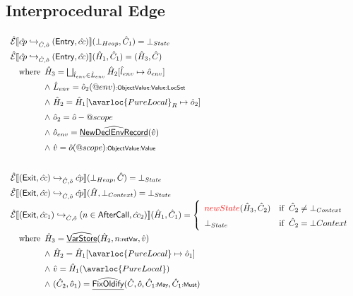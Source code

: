 \subsection{Interprocedural Edge}
\[
\renewcommand\arraystretch{1.5}
\begin{array}{l}
\aE \lbr \acp \cfgnext_{\hat{C},\hat{o}} (\SF{Entry},\hat{cc}) \rbr (\bot_{Heap},\hat{C}_1) 
    = \bot_{State}\\

\aE \lbr \acp \cfgnext_{\hat{C},\hat{o}} (\SF{Entry},\hat{cc}) \rbr (\hat{H}_1,\hat{C}_1) 
    = (\hat{H}_3,\hat{C}) \\
  \quad\wherec{
    \hat{H}_3 = \bigsqcup_{\hat{l}_{env}\in \hat{L}_{env}} \hat{H}_2[\hat{l}_{env} \mapsto \hat{o}_{env}]\\
    \land\ \hat{L}_{env} = \hat{o}_2(\varprop{env})\tsf{:ObjectValue:Value:LocSet}\\
    \land\ \hat{H}_2 = \hat{H}_1[\avarloc{PureLocal}_R \mapsto \hat{o}_2] \\
    \land\ \hat{o}_2 = \hat{o} - \varprop{scope} \\
    \land\ \hat{o}_{env} = \ahf{NewDeclEnvRecord}(\hat{v}) \\
    \land\ \hat{v} = \hat{o}(\varprop{scope})\tsf{:ObjectValue:Value}
  }
\\\\

\aE \lbr (\SF{Exit}, \hat{cc}) \cfgnext_{\hat{C},\hat{o}} \acp \rbr (\bot_{Heap}, \hat{C})
    = \bot_{State}\\

\aE \lbr (\SF{Exit}, \hat{cc}) \cfgnext_{\hat{C},\hat{o}} \acp \rbr (\hat{H}, \bot_{Context})
    = \bot_{State}\\

\aE \lbr (\SF{Exit}, \hat{cc}_1) \cfgnext_{\hat{C},\hat{o}} (n \in \SF{AfterCall}, \hat{cc}_2) \rbr (\hat{H}_1, \hat{C}_1)
   = \left\{
   \begin{array}{ll}
   {\inred new State}(\hat{H}_3, \hat{C}_2) & \ifc{\hat{C}_2 \neq \bot_{Context}}\\
   \bot_{State} & \ifc{\hat{C}_2 = \bot{Context}}\\
   \end{array}
   \right. \\
\quad\wherec{
    \hat{H}_3 = \ahf{VarStore}(\hat{H}_2, n\tsf{:retVar}, \hat{v})\\
	\land\ \hat{H}_2 = \hat{H}_1[\avarloc{PureLocal} \mapsto \hat{o}_1]\\
	\land\ \hat{v} = \hat{H}_1(\avarloc{PureLocal})\\
	\land\ (\hat{C}_2, \hat{o}_1) = \ahf{FixOldify}(\hat{C}, \hat{o}, \hat{C}_1\tsf{:May}, \hat{C}_1\tsf{:Must})
}\\\\


\end{array}\]
